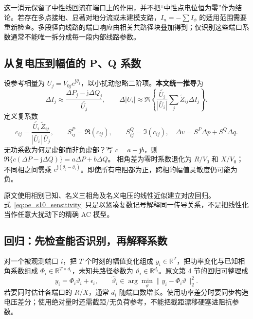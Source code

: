 \documentclass[UTF8,11pt,fontset=fandol,openany,oneside]{ctexbook}
\newcommand{\R}{\mathbb{R}}
\theoremstyle{definition}
\theoremstyle{remark}
\numberwithin{equation}{chapter}
\begin{document}
这一消元保留了中性线回流在端口上的作用，并不把“中性点电位恒为零”作为结论。若存在多点接地、显著对地分流或未建模支路，$I_n=-\sum I_\phi$ 的适用范围需要重新检查。多段径向线路的端口响应由相关共路径块叠加得到；仅识别这些端口系数通常不能唯一拆分成每一段内部线路参数。

\subsection{从复电压到幅值的 P、Q 系数}

设参考相量为 $\bar U_j=V_{0j}e^{\mathrm j\theta_j}$，以小扰动忽略二阶项。\textbf{本文统一推导}为
\begin{equation}
 \Delta I_j\approx\frac{\Delta P_j-\mathrm j\Delta Q_j}{\overline{\bar U_j}},\qquad
 \Delta|U_i|\approx\Re\left\{\frac{\overline{\bar U_i}}{|\bar U_i|}
          \sum_j\widetilde Z_{ij}\Delta I_j\right\}.
 \label{eq:oe_s10_differential}
\end{equation}
定义复系数
\begin{equation}
 c_{ij}=\frac{\overline{\bar U_i}\,\widetilde Z_{ij}}
 {|\bar U_i|\,\overline{\bar U_j}},\qquad
 S^P_{ij}=\Re(c_{ij}),\qquad S^Q_{ij}=\Im(c_{ij}),
 \quad \Delta v=S^P\Delta p+S^Q\Delta q.
 \label{eq:oe_s10_sensitivity}
\end{equation}
无功系数为何是虚部而非负虚部？写 $c=a+\mathrm jb$，则
$\Re\{c(\Delta P-\mathrm j\Delta Q)\}=a\Delta P+b\Delta Q$。
相角差为零时系数退化为 $R/V_0$ 和 $X/V_0$；不同相之间需乘
$e^{\mathrm j(\theta_j-\theta_i)}$。即使所有电阻都为正，跨相的幅值灵敏度仍可能为负。

原文使用相别已知、名义三相角及名义电压的线性近似建立对应回归。式~\eqref{eq:oe_s10_sensitivity} 只是以紧凑复数记号解释同一传导关系，不是把线性化当作任意大扰动下的精确 AC 模型。

\subsection{回归：先检查能否识别，再解释系数}

对一个被观测端口 $i$，把 $T$ 个时刻的幅值变化组成
$y_i\in\R^T$，把功率变化与已知相角系数组成
$\Phi_i\in\R^{T\times d_i}$，未知共路径参数为
$\vartheta_i\in\R^{d_i}$。原文第 4 节的回归可整理成
\begin{equation}
 y_i=\Phi_i\vartheta_i+\epsilon_i,\qquad
 \hat\vartheta_i\in\arg\min_\vartheta\|y_i-\Phi_i\vartheta\|_2^2.
 \label{eq:oe_s10_regression}
\end{equation}
若要同时估计各端口的 $R/X$，通常 $d_i$ 随端口数增长。使用功率差分时要同步构造电压差分；使用绝对量时还需截距/无负荷参考，不能把截距漂移硬塞进阻抗参数。
\end{document}
